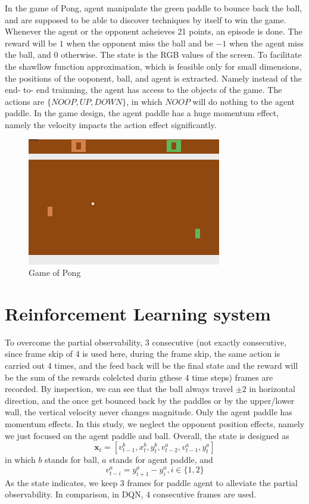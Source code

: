 \documentclass[12pt]{article}
\begin{document}
In the game of Pong, agent manipulate the green paddle to bounce back the
ball, and are supposed to be able to discover techniques by itself to
win the game. Whenever the agent or the opponent acheieves 21 points,
an episode is done. The reward will be $1$ when the opponent miss the
ball and be $-1$ when the agent miss the ball, and $0$ otherwise. The
state is the RGB values of the screen. To facilitate the shawllow
function approximation, which is feasible only for small dimensions,
the positions of the ooponent, ball, and agent is extracted. Namely
instead of the end\-- to\-- end trainning, the agent has access to the
objects of the game. The actions are $\{NOOP, UP, DOWN\}$, in which
$NOOP$ will do nothing to the agent paddle. In the game design, the
agent paddle has a huge momentum effect, namely the velocity
impacts the action effect significantly.
\begin{figure}[h]
    \centering
    \includegraphics [scale=0.5]{pong.png}
    \caption {Game of Pong}
\end{figure}

\section{Reinforcement Learning system}
To overcome the partial observability, $3$ consecutive (not exactly
consecutive, since frame skip of 4 is used here, during the frame
skip, the same action is carried out 4 times, and the feed back will
be the final state and the reward will be the sum of the rewards
colelcted durin gthese 4 time steps) frames are recorded. By
inspection, we can see that the ball always travel $\pm 2$ in
horizontal direction, and the once get bounced back by the paddles or
by the upper/lower wall, the vertical velocity never changes
magnitude. Only the agent paddle has momentum effects. In this study,
we neglect the opponent position effects, namely we just focused on
the agent paddle and ball. Overall, the state is designed as
\begin{equation}
    \bm x_t=[v_{t-1}^b, x_t^b, y_t^b, v_{t-2}^a, v_{t-1}^a, y_t^a]
\end{equation}
in which $b$ stands for ball, $a$ stands for agent paddle, and 
\begin{equation}
    v_{t-i}^a=y_{i+1}^a-y_i^a, i\in\{1,2\}
\end{equation}
As the state indicates, we keep 3 frames for paddle agent to alleviate
the partial observability. In comparison, in DQN\cite{15atari}, 4
consecutive frames are used.
\end{document}
